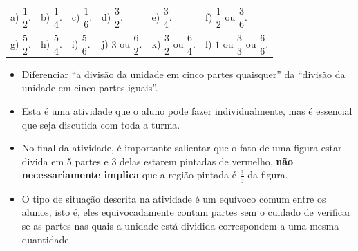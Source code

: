 \begin{solucao}{}{}

\noindent\begin{tabular}{m{}m{}m{}m{}m{}m{}}
  a) $\dfrac{1}{2}$. &  b) $\dfrac{1}{4}$. & c) $\dfrac{1}{6}$. & d) $\dfrac{3}{2}$. &  e) $\dfrac{3}{4}$. &  f) $\dfrac{1}{2}$ ou $\dfrac{3}{6}$.   \\
\\
g) $\dfrac{5}{2}$. &  h) $\dfrac{5}{4}$. & i) $\dfrac{5}{6}$. & j) $3$ ou $\dfrac{6}{2}$.
    &  k) $\dfrac{3}{2}$ ou $\dfrac{6}{4}$. &  l) $1$ ou $\dfrac{3}{3}$ ou $\dfrac{6}{6}$.
\end{tabular} %

\end{solucao}
\null
\vfill

    
  \begin{objetivos}[label=chap2-ativ16]{}{}
  \begin{itemize} %
    \item Diferenciar ``a divisão da unidade em cinco partes quaisquer'' da ``divisão da unidade em cinco partes iguais''.
\end{itemize} %
\end{objetivos}

\begin{orientacoes}
\begin{itemize} %
    \item       Esta é uma atividade que o aluno pode fazer individualmente, mas é essencial que seja discutida com toda a turma.
    \item       No final da atividade, é importante salientar que o fato de  uma figura estar divida em 5 partes e 3 delas estarem pintadas de vermelho,       {\bf não necessariamente implica}       que a região pintada é       $\frac{3}{5}$ da figura.
    \item       O tipo de situação descrita na atividade é um equívoco comum entre os alunos, isto é, eles equivocadamente contam partes sem o cuidado de verificar se as partes nas quais a unidade está dividida correspondem a uma mesma quantidade.
\end{itemize} %


\end{orientacoes}

